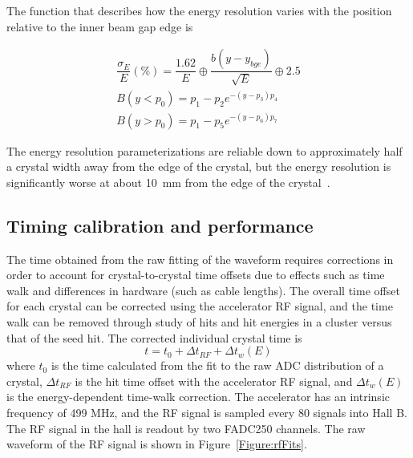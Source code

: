 The function that describes how the energy resolution varies with the position relative to the inner beam gap edge is 

\begin{equation}
\begin{split}
\label{eq:finalRes}
\dfrac{\sigma_E}{E}(\%)=\dfrac{1.62}{E}\oplus \dfrac{b(y-y_{bge})}{\sqrt{E}} \oplus 2.5 \\
B(y<p_0) = p_1-p_2 e^{-(y-p_3)p_4}\\
B(y>p_0) = p_1-p_5 e^{-(y-p_6)p_7}
\end{split}
\end{equation}

The energy resolution parameterizations are reliable down to approximately half a crystal width away from the edge of the crystal, but the energy resolution is significantly worse at about 10~mm from the edge of the crystal~\cite{szumila-vance_hps_2016}.

\subsection{Timing calibration and performance}
The time obtained from the raw fitting of the waveform requires corrections in order to account for crystal-to-crystal time offsets due to effects such as time walk and differences in hardware (such as cable lengths). The overall time offset for each crystal can be corrected using the accelerator RF signal, and the time walk can be removed through study of hits and hit energies in a cluster versus that of the seed hit. The corrected individual crystal time is \\

\begin{equation}
	\label{eq:toff}
	t = t_0 +\Delta t_{RF} + \Delta t_w (E)
\end{equation}
where $t_0$ is the time calculated from the fit to the raw ADC distribution of a crystal, $\Delta t_{RF}$ is the hit time offset with the accelerator RF signal, and $\Delta t_w(E)$ is the energy-dependent time-walk correction. The accelerator has an intrinsic frequency of 499 MHz, and the RF signal is sampled every 80 signals into Hall B. The RF signal in the hall is readout by two FADC250 channels. The raw waveform of the RF signal is shown in Figure~\ref{Figure:rfFits}. 

